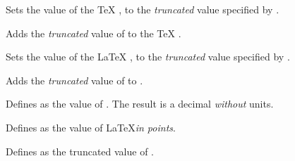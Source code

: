 \begin{command}{\pgfmathsetcount{}}
  Sets the value of the \TeX{} , to the 
  \emph{truncated} value specified by . 
\end{command}

\begin{command}{\pgfmathaddtocount{}}
  Adds the \emph{truncated} value  of  to the \TeX{} 
  .
\end{command}

\begin{command}{\pgfmathsetcounter{}}
  Sets the value of the \LaTeX{} , to the \emph{truncated} 
  value specified by . 
\end{command}

\begin{command}{\pgfmathaddtocounter{}}
  Adds the \emph{truncated} value  of  to 
  .
\end{command}


\begin{command}{\pgfmathsetmacro{}}
  Defines  as the  value of . The result
  is a decimal \emph{without} units.
\end{command}

\begin{command}{\pgfmathsetlengthmacro{}}
  Defines  as the value of  
  \LaTeX{}\emph{in points}.
\end{command}

\begin{command}{\pgfmathtruncatemacro{}}
  Defines  as the truncated value of .
\end{command}



